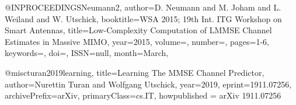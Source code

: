 \documentclass[12pt, draftclsnofoot, onecolumn]{IEEEtran}
\begin{document}
@INPROCEEDINGS{Neumann2,
author={D. {Neumann} and M. {Joham} and L. {Weiland} and W. {Utschick}},
booktitle={WSA 2015; 19th Int. ITG Workshop on Smart Antennas},
title={Low-Complexity Computation of {LMMSE} Channel Estimates in Massive {MIMO}},
year={2015},
volume={},
number={},
pages={1-6},
keywords={},
doi={},
ISSN={null},
month={March},}

@misc{turan2019learning,
    title={{Learning} {The} {MMSE} {Channel Predictor}},
    author={Nurettin Turan and Wolfgang Utschick},
    year={2019},
    eprint={1911.07256},
    archivePrefix={arXiv},
    primaryClass={cs.IT},
    howpublished = {arXiv 1911.07256}
} 
\end{document}
